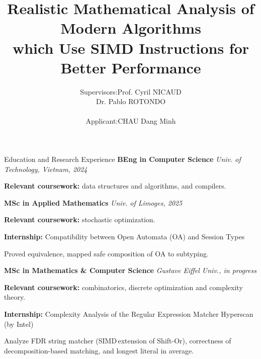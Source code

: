 \documentclass[xcolor=dvipsnames, aspectratio=169, 10pt]{beamer}
\title[]{Realistic Mathematical Analysis
of Modern Algorithms \\ which Use SIMD Instructions for Better
Performance}
\author[Minh]{
		\begin{tabular}{lll}
      {\small Supervisors:} & \small Prof. Cyril NICAUD \\
      & Dr. Pablo ROTONDO\\\\
			{\small Applicant:} & \small CHAU Dang Minh
		\end{tabular}
	}
\institute[Gustave Eiffel]{
	{
    \vspace{0.5cm}
		Gustave Eiffel University, LIGM \\
	}
}
\begin{document}
\date{}
\begin{frame}
  \titlepage
\end{frame}

\begin{frame}{Education and Research Experience}
  \textbf{BEng in Computer Science} \hfill \textit{Univ. of Technology, Vietnam, 2024}

  \hspace{1.5em}\begin{minipage}{\dimexpr\linewidth-1.5em\relax}
    \textbf{Relevant coursework:} data structures and algorithms, and compilers.
  \end{minipage}

  \vspace{1em}

  \textbf{MSc in Applied Mathematics} \hfill \textit{Univ. of Limoges, 2025}

  \hspace{1.5em}\begin{minipage}{\dimexpr\linewidth-1.5em\relax}
    \textbf{Relevant coursework:} stochastic optimization.

    \textbf{Internship:} Compatibility between Open Automata (OA) and Session Types

    \hspace{0.5cm} Proved equivalence, mapped safe composition of OA to subtyping.

  \end{minipage}

  \vspace{1em}

  \textbf{MSc in Mathematics \& Computer Science} \hfill \textit{Gustave Eiffel Univ., in progress}

  \hspace{1.5em}\begin{minipage}{\dimexpr\linewidth-1.5em\relax}
    \textbf{Relevant coursework:} combinatorics, discrete optimization and complexity theory.

    \textbf{Internship:} Complexity Analysis of the Regular Expression Matcher \textcolor{gustave}{Hyperscan} (by Intel)

    {\leftskip=0.5cm
      Analyze FDR string matcher (SIMD\footnotemark \,extension of Shift-Or), correctness of decomposition-based matching, and longest literal in average.\par
    }
  \end{minipage}
\end{frame}
\end{document}
